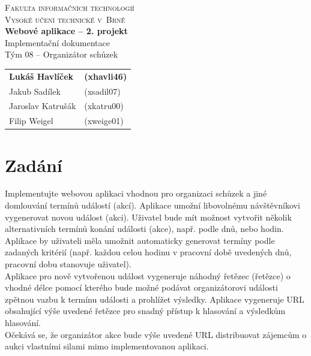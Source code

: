 \documentclass[11pt, a4paper]{article}
\begin{document}
\begin{center}


\Huge
\textsc{Fakulta informačních technologií\\
Vysoké učení technické v~Brně}
\\[84mm]
\Huge \textbf{Webové aplikace -- 2. projekt}\\
\LARGE{Implementační dokumentace}\\
\LARGE  Tým 08 -- Organizátor schůzek\\
\end{center}

\hfill


\begin{minipage}[l]{0.6 \textwidth}
\Large
\begin{tabular}{l l}
\textbf{Lukáš Havlíček} & \textbf{(xhavli46)}\\
Jakub Sadílek & (xsadil07)\\
Jaroslav Katrušák & (xkatru00)\\
Filip Weigel & (xweige01)\\
\end{tabular}
\end{minipage}

\thispagestyle{empty}
\clearpage
\setcounter{page}{1}

\section{Zadání}
Implementujte webovou aplikaci vhodnou pro organizaci schůzek a jiné domlouvání termínů událostí (akcí). Aplikace umožní libovolnému návštěvníkovi vygenerovat novou událost (akci). Uživatel bude mít možnost vytvořit několik alternativních termínů konání události (akce), např. podle dnů, nebo hodin. Aplikace by uživateli měla umožnit automaticky generovat termíny podle zadaných kritérií (např. každou celou hodinu v pracovní době uvedených dnů, pracovní dobu stanovuje uživatel).\\

Aplikace pro nově vytvořenou událost vygeneruje náhodný řetězec (řetězce) o vhodné délce pomocí kterého bude možné podávat organizátorovi události zpětnou vazbu k termínu události a prohlížet výsledky. Aplikace vygeneruje URL obsahující výše uvedené řetězce pro snadný přístup k hlasování a výsledkům hlasování.\\

Očekává se, že organizátor akce bude výše uvedené URL distribuovat zájemcům o aukci vlastními silami mimo implementovanou aplikaci.\\
\end{document}
